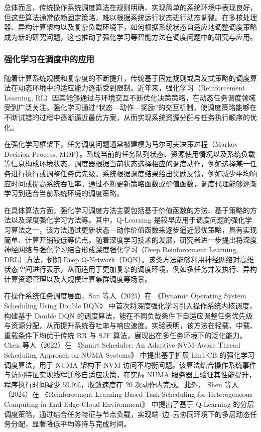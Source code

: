 总体而言，传统操作系统调度算法在规则明确、实现简单的系统环境中表现良好，但这些算法通常依赖固定策略，难以根据系统运行状态进行动态调整。在多核处理器、异构计算架构以及复杂负载环境下，如何根据系统状态自适应地调整调度策略成为新的研究问题，这也推动了强化学习等智能方法在调度问题中的研究与应用。
\subsubsection{强化学习在调度中的应用}
随着计算系统规模和复杂度的不断提升，传统基于固定规则或启发式策略的调度算法在动态环境中的适应能力逐渐受到限制。近年来，强化学习（Reinforcement Learning, RL）因其能够通过与环境交互不断优化决策策略，在动态任务调度领域受到广泛关注。强化学习通过“状态—动作—奖励”的交互机制，使调度策略能够在不断试错的过程中逐渐逼近最优方案，从而实现系统资源分配与任务执行顺序的优化。

在强化学习框架下，任务调度问题通常被建模为马尔可夫决策过程（Markov Decision Process, MDP）。系统当前的任务队列状态、资源使用情况以及系统负载等信息构成环境状态，调度器根据当前状态选择相应的调度动作，例如选择某一任务进行执行或调整任务优先级。系统根据调度结果给出奖励反馈，例如减少平均响应时间或提高系统吞吐率。通过不断更新策略函数或价值函数，调度代理能够逐渐学习到适合当前系统环境的调度策略。

在具体算法方面，强化学习调度方法主要包括基于价值函数的方法、基于策略的方法以及深度强化学习方法等。其中，Q-Learning 是较早应用于调度问题的强化学习算法之一，该方法通过更新状态—动作价值函数来逐步逼近最优策略，具有实现简单、计算开销较低等优点\cite{shyalika2020reinforcement}。随着深度学习技术的发展，研究者进一步提出将深度神经网络与强化学习结合形成深度强化学习（Deep Reinforcement Learning, DRL）方法，例如 Deep Q-Network（DQN）。该类方法能够利用神经网络对高维状态空间进行表示，从而适用于更加复杂的调度环境，例如多任务并发执行、异构计算资源管理以及大规模计算集群调度等场景。

在操作系统任务调度层面，Sun 等人（2025）在 《Dynamic Operating System Scheduling Using Double DQN》 中首次将深度强化学习引入操作系统内核调度，构建基于 Double DQN 的调度算法，能在不同负载条件下自适应调整任务优先级与资源分配，从而提升系统吞吐率与响应速度。实验表明，该方法在轻载、中载、重载条件下均优于传统 RR 与 SJF 算法，展现出在多任务环境下的泛化能力\cite{sun2025dynamic}。Chen 等人（2022）在 《Smart Scheduler: An Adaptive NVM-Aware Thread Scheduling Approach on NUMA Systems》 中提出基于扩展 LinUCB 的强化学习调度算法，用于 NUMA 架构下 NVM 访问不均衡问题。该算法结合操作系统事件与访问特征实现线程迁移自适应决策，在实际 NUMA 服务器上验证其性能提升，程序执行时间减少 59.9\%，收敛速度在 20 次动作内完成\cite{chen2022smart}。此外， Shen 等人（2024）在 《Reinforcement Learning-Based Task Scheduling for Heterogeneous Computing in End-Edge-Cloud Environment》 中提出了基于 Q-Learning 的分层调度策略，通过结合任务特征与节点负载，实现端–边–云协同环境下的多层动态任务分配，显著降低平均等待与完成时间\cite{shen2025reinforcement}。

